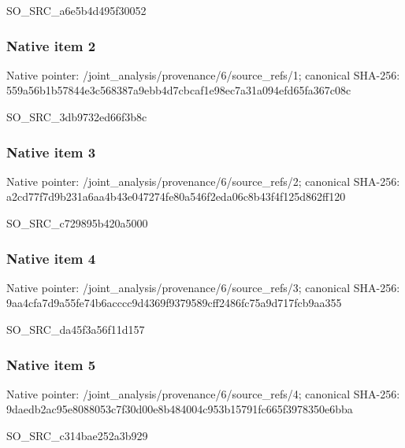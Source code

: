 \documentclass[10pt,a4paper]{article}
\begin{document}
\begingroup\raggedright\sloppy SO\_\allowbreak{}SRC\_\allowbreak{}a6e5b4d495f30052\par\endgroup

\subsubsection{Native item 2}
Native pointer: /joint\_\allowbreak{}analysis/provenance/6/source\_\allowbreak{}refs/1; canonical SHA-256: 559a56b1b57844e3c568387a9ebb4d7cbcaf1e98ec7a31a094efd65fa367c08c

\begingroup\raggedright\sloppy SO\_\allowbreak{}SRC\_\allowbreak{}3db9732ed66f3b8c\par\endgroup

\subsubsection{Native item 3}
Native pointer: /joint\_\allowbreak{}analysis/provenance/6/source\_\allowbreak{}refs/2; canonical SHA-256: a2cd77f7d9b231a6aa4b43e047274fe80a546f2eda06c8b43f4f125d862ff120

\begingroup\raggedright\sloppy SO\_\allowbreak{}SRC\_\allowbreak{}c729895b420a5000\par\endgroup

\subsubsection{Native item 4}
Native pointer: /joint\_\allowbreak{}analysis/provenance/6/source\_\allowbreak{}refs/3; canonical SHA-256: 9aa4cfa7d9a55fe74b6acccc9d4369f9379589cff2486fc75a9d717fcb9aa355

\begingroup\raggedright\sloppy SO\_\allowbreak{}SRC\_\allowbreak{}da45f3a56f11d157\par\endgroup

\subsubsection{Native item 5}
Native pointer: /joint\_\allowbreak{}analysis/provenance/6/source\_\allowbreak{}refs/4; canonical SHA-256: 9daedb2ac95e8088053c7f30d00e8b484004c953b15791fc665f3978350e6bba

\begingroup\raggedright\sloppy SO\_\allowbreak{}SRC\_\allowbreak{}c314bae252a3b929\par\endgroup
\end{document}
